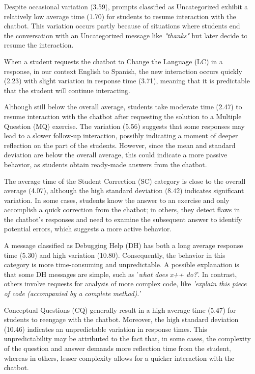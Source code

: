 \documentclass[a4paper,twoside]{article}
\begin{document}
Despite occasional variation (3.59), prompts classified as Uncategorized exhibit
a relatively low average time (1.70) for students to resume interaction with the
chatbot. This variation occurs partly because of situations where students end
the conversation with an Uncategorized message like \textit{"thanks"} but later
decide to resume the interaction.

When a student requests the chatbot to Change the Language (LC)  in a response,
in our context English to Spanish, the new interaction occurs quickly (2.23)
with slight variation in response time (3.71), meaning that it is predictable
that the student will continue interacting.

Although still below the overall average, students take moderate time (2.47) to
resume interaction with the chatbot after requesting the solution to a Multiple
Question (MQ) exercise. The variation (5.56) suggests that some responses may
lead to a slower follow-up interaction, possibly indicating a moment of deeper
reflection on the part of the students. However, since the mean and standard
deviation are below the overall average, this could indicate a more passive
behavior, as students obtain ready-made answers from the chatbot.

The average time of the Student Correction (SC) category is close to the overall
average (4.07), although the high standard deviation (8.42) indicates
significant variation. In some cases, students know the answer to an exercise
and only accomplish a quick correction from the chatbot; in others, they detect
flaws in the chatbot's responses and need to examine the subsequent answer to
identify potential errors, which suggests a more active behavior.

A message classified as Debugging Help (DH) has both a long average response
time (5.30) and high variation (10.80). Consequently, the behavior in this
category is more time-consuming and unpredictable. A possible explanation is
that some DH messages are simple, such as '\textit{what does x++ do?}'. In
contrast, others involve requests for analysis of more complex code, like
\textit{'explain this piece of code (accompanied by a complete method).'}

Conceptual Questions (CQ) generally result in a high average time (5.47) for
students to reengage with the chatbot. Moreover, the high standard deviation
(10.46) indicates an unpredictable variation in response times. This
unpredictability may be attributed to the fact that, in some cases, the
complexity of the question and answer demands more reflection time from the
student, whereas in others, lesser complexity allows for a quicker interaction
with the chatbot.
\end{document}
